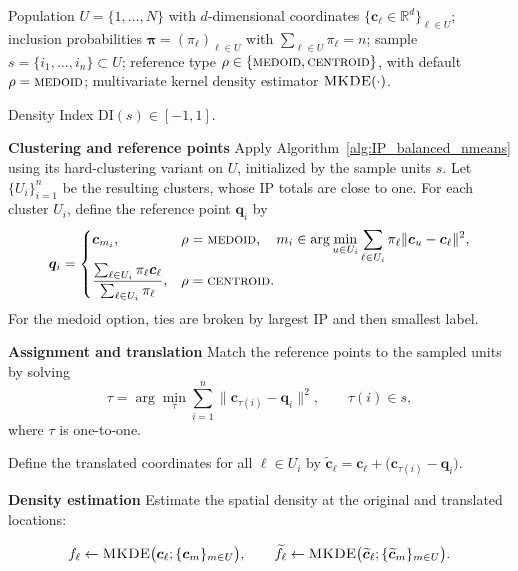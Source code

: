 \documentclass[12pt]{imsart}
\theoremstyle{plain}
\theoremstyle{remark}
\begin{document}
\begin{algorithm}[H]
\caption{Density Index (DI)}
\label{A-alg:DI}
\small
\begin{algorithmic}[1]

\Require Population \(U=\{1,\dots,N\}\) with \(d\)-dimensional coordinates
\(\{\bm c_\ell\in\mathbb R^d\}_{\ell\in U}\); inclusion probabilities
\(\bm\pi=(\pi_\ell)_{\ell\in U}\) with \(\sum_{\ell\in U}\pi_\ell=n\);
sample \(s=\{i_1,\dots,i_n\}\subset U\); reference type
\(\rho\in\{\textsc{medoid},\textsc{centroid}\}\), with default
\(\rho=\textsc{medoid}\); multivariate kernel density estimator
\(\textsc{MKDE}(\cdot)\).

\Ensure Density Index \(\mathrm{DI}(s)\in[-1,1]\).

\Statex \textbf{Clustering and reference points}
\State Apply Algorithm~\ref{alg:IP_balanced_nmeans} using its hard-clustering
variant on \(U\), initialized by the sample units \(s\).
\label{line:upbkm}
\State Let \(\{U_i\}_{i=1}^n\) be the resulting clusters, whose IP totals are close to one.
\label{line:clusters}
\State  For each cluster \(U_i\), define the reference point \(\bm q_i\) by
\[
\bm q_i
=
\begin{cases}
\bm c_{m_i}, &
\rho=\textsc{medoid},\quad
m_i\in\displaystyle\arg\min_{u\in U_i}
\sum_{\ell\in U_i}\pi_\ell\|\bm c_u-\bm c_\ell\|^2, \\[2ex]
\displaystyle
\frac{\sum_{\ell\in U_i}\pi_\ell\bm c_\ell}
{\sum_{\ell\in U_i}\pi_\ell}, &
\rho=\textsc{centroid}.
\end{cases}
\]
For the medoid option, ties are broken by largest IP and then smallest label.

\Statex \textbf{Assignment and translation}
\State Match the reference points to the sampled units by solving
\[
\tau
=
\arg\min_{\tau}
\sum_{i=1}^n
\|\bm c_{\tau(i)}-\bm q_i\|^2,
\qquad
\tau(i)\in s,
\]
where \(\tau\) is one-to-one.
\label{line:hungarian}

\State Define the translated coordinates for all \(\ell\in U_i\) by
\(
\widetilde{\bm c}_\ell
=
\bm c_\ell+\bigl(\bm c_{\tau(i)}-\bm q_i\bigr).
\)
\EndFor
\label{line:T}

\Statex \textbf{Density estimation}
\State Estimate the spatial density at the original and translated locations:

\[
f_\ell
\gets
\textsc{MKDE}\bigl(\bm c_\ell;\{\bm c_m\}_{m\in U}\bigr),
\qquad
\widetilde f_\ell
\gets
\textsc{MKDE}\bigl(\widetilde{\bm c}_\ell;
\{\widetilde{\bm c}_m\}_{m\in U}\bigr).
\]
\label{line:mkde}


\end{algorithmic}
\end{algorithm}
\end{document}
